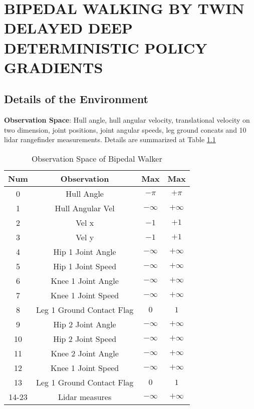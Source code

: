 \chapter{BIPEDAL WALKING BY TWIN DELAYED DEEP DETERMINISTIC POLICY GRADIENTS}
\label{chap:exp_setup}

\section{Details of the Environment}

\textbf{Observation Space}: Hull angle, hull angular velocity, translational velocity on two dimension, joint positions, joint angular speeds, leg ground concats and 10 lidar rangefinder measurements. Details are summarized at Table \ref{table:bpw_obs_space}

\begin{table}[h!]
	\begin{center}
	\begin{tabular}{cccc}
		\textbf{Num} & \textbf{Observation} & \textbf{Max} & \textbf{Max} \\
		\hline
		0  & Hull Angle & $-\pi$ & $+\pi$ \\
		1  & Hull Angular Vel & $-\infty$ & $+\infty$ \\
		2  & Vel x & $-1$ & $+1$ \\
		3  & Vel y & $-1$ & $+1$ \\
		4  & Hip 1 Joint Angle & $-\infty$ & $+\infty$ \\
		5  & Hip 1 Joint Speed & $-\infty$ & $+\infty$ \\
		6  & Knee 1 Joint Angle & $-\infty$ & $+\infty$ \\
		7  & Knee 1 Joint Speed & $-\infty$ & $+\infty$ \\
		8  & Leg 1 Ground Contact Flag & $0$ & $1$ \\
		9  & Hip 2 Joint Angle & $-\infty$ & $+\infty$ \\
		10  & Hip 2 Joint Speed & $-\infty$ & $+\infty$ \\
		11  & Knee 2 Joint Angle & $-\infty$ & $+\infty$ \\
		12  & Knee 1 Joint Speed & $-\infty$ & $+\infty$ \\
		13  & Leg 1 Ground Contact Flag & $0$ & $1$ \\
		14-23  & Lidar measures  & $-\infty$ & $+\infty$
	\end{tabular}
	\end{center}
	\caption{Observation Space of Bipedal Walker}
	\label{table:bpw_obs_space}
\end{table}


